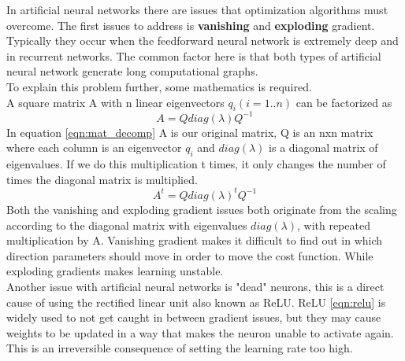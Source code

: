 In artificial neural networks there are issues that optimization algorithms must overcome. The first issues to address is \textbf{vanishing} and \textbf{exploding} gradient. Typically they occur when the feedforward neural network is extremely deep and in recurrent networks. The common factor here is that both types of artificial neural network generate long computational graphs. \\
To explain this problem further, some mathematics is required.\\
A square matrix A with n linear eigenvectors $q_i (i=1..n)$ can be factorized as
\begin{equation} \label{eqn:mat_decomp}
    A=Q diag(\lambda) Q^{-1} 
\end{equation}
In equation \ref{eqn:mat_decomp} A is our original matrix, Q is an nxn matrix where each column is an eigenvector $q_i$ and $diag(\lambda)$ is a diagonal matrix of eigenvalues. If we do this multiplication t times, it only changes the number of times the diagonal matrix is multiplied. \cite{weisstein_eigen_????}
\begin{equation} \label{eqn:mat_decomp_t}
    A^{t} = Q diag(\lambda)^{t} Q^{-1}
\end{equation}
Both the vanishing and exploding gradient issues both originate from the scaling according to the diagonal matrix with eigenvalues $diag(\lambda)$, with repeated multiplication by A. Vanishing gradient makes it difficult to find out in which direction parameters should move in order to move the cost function. While exploding gradients makes learning unstable. \cite{goodfellow_deep_2016} \\

Another issue with artificial neural networks is "dead" neurons, this is a direct cause of using the rectified linear unit also known as ReLU. ReLU \ref{eqn:relu} is widely used to not get caught in between gradient issues, but they may cause weights to be updated in a way that makes the neuron unable to activate again. This is an irreversible consequence of setting the learning rate too high. \cite{_cs231n_????}


